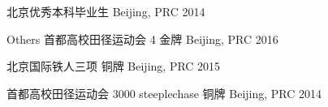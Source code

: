 \begin{cvhonors}
\cvhonor
{} %
{北京优秀本科毕业生} %
{Beijing, PRC} %
{2014} %


\cvhonor
{Others} %
{首都高校田径运动会 4 金牌} %
{Beijing, PRC} %
{2016} %

\cvhonor
{} %
{北京国际铁人三项 铜牌} %
{Beijing, PRC} %
{2015} %

\cvhonor
{} %
{首都高校田径运动会 3000 steeplechase 铜牌} %
{Beijing, PRC} %
{2014} %


\end{cvhonors}
